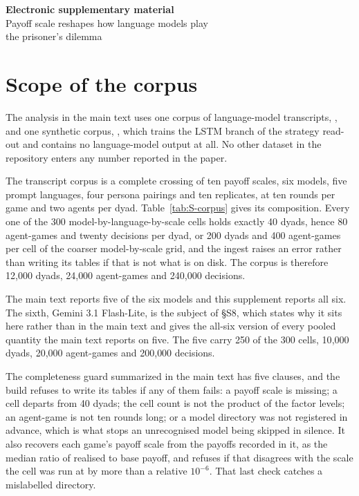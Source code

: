 \documentclass[11pt,a4paper]{article}
\date{}
\begin{document}
\begin{center}
{\LARGE\bfseries Electronic supplementary material}\\[6pt]
{\large Payoff scale reshapes how language models play\\[2pt]
the prisoner's dilemma}
\end{center}
\bigskip

\tableofcontents
\bigskip

\section{Scope of the corpus}

The analysis in the main text uses one corpus of language-model transcripts,
, and one synthetic corpus,
, which trains the LSTM branch of the strategy
read-out and contains no language-model output at all. No other dataset in the
repository enters any number reported in the paper.

The transcript corpus is a complete crossing of ten payoff scales, six models,
five prompt languages, four persona pairings and ten replicates, at ten rounds
per game and two agents per dyad. Table~\ref{tab:S-corpus} gives its
composition. Every one of the 300 model-by-language-by-scale cells holds
exactly 40 dyads, hence 80 agent-games and twenty decisions per dyad, or 200
dyads and 400 agent-games per cell of the coarser model-by-scale grid, and the
ingest raises an error rather than writing its tables if that is not what is on
disk. The corpus is therefore 12{,}000 dyads, 24{,}000 agent-games and
240{,}000 decisions.

The main text reports five of the six models and this supplement reports all
six. The sixth, Gemini 3.1 Flash-Lite, is the subject of \S S8, which states why
it sits here rather than in the main text and gives the all-six version of every
pooled quantity the main text reports on five. The five carry 250 of the 300
cells, 10{,}000 dyads, 20{,}000 agent-games and 200{,}000 decisions.

The completeness guard summarized in the main text has five clauses, and the
build refuses to write its tables if any of them fails: a payoff scale is
missing; a cell departs from 40 dyads; the cell count is not the product of the
factor levels; an agent-game is not ten rounds long; or a model directory was
not registered in advance, which is what stops an unrecognised model being
skipped in silence. It also recovers each game's payoff scale from the payoffs
recorded in it, as the median ratio of realised to base payoff, and refuses if
that disagrees with the scale the cell was run at by more than a relative
$10^{-6}$. That last check catches a mislabelled directory.
\end{document}
